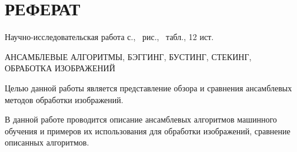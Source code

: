 
\chapter*{РЕФЕРАТ}

Научно-исследовательская работа \pageref{LastPage} с., \totalfigures \ рис., \totaltables\ табл., 12  ист.

АНСАМБЛЕВЫЕ АЛГОРИТМЫ, БЭГГИНГ, БУСТИНГ, СТЕКИНГ, \linebreak ОБРАБОТКА ИЗОБРАЖЕНИЙ

Целью данной работы является представление обзора и сравнения ансамблевых методов обработки изображений.

В данной работе проводится описание ансамблевых алгоритмов машинного обучения и примеров их использования для обработки изображений, сравнение описанных алгоритмов.



\pagebreak